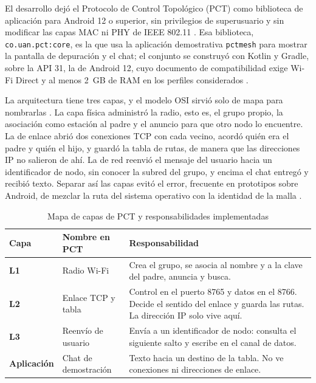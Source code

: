 \documentclass[12pt,oneside]{scrreprt}
\begin{document}
El desarrollo dejó el Protocolo de Control Topológico (PCT) como biblioteca de aplicación para Android 12 o superior, sin privilegios de superusuario y sin modificar las capas MAC ni PHY de IEEE 802.11 \parencite{IEEE2020,Google2021}. Esa biblioteca, \texttt{co.uan.pct:core}, es la que usa la aplicación demostrativa \texttt{pctmesh} para mostrar la pantalla de depuración y el chat; el conjunto se construyó con Kotlin y Gradle, sobre la API 31, la de Android 12, cuyo documento de compatibilidad exige Wi-Fi Direct y al menos 2~GB de RAM en los perfiles considerados \parencite{Google2021}.

La arquitectura tiene tres capas, y el modelo OSI sirvió solo de mapa para nombrarlas \parencite{Tanenbaum2011}. La capa física administró la radio, esto es, el grupo propio, la asociación como estación al padre y el anuncio para que otro nodo lo encuentre. La de enlace abrió dos conexiones TCP con cada vecino, acordó quién era el padre y quién el hijo, y guardó la tabla de rutas, de manera que las direcciones IP no salieron de ahí. La de red reenvió el mensaje del usuario hacia un identificador de nodo, sin conocer la subred del grupo, y encima el chat entregó y recibió texto. Separar así las capas evitó el error, frecuente en prototipos sobre Android, de mezclar la ruta del sistema operativo con la identidad de la malla \parencite{TanenbaumVanSteen2007}.

\begin{table}[H]
\centering
\singlespacing
\caption{Mapa de capas de PCT y responsabilidades implementadas}
\label{tab:met-capas}
\renewcommand{\arraystretch}{1.15}
\begin{tabularx}{\textwidth}{@{} >{\raggedright\arraybackslash\bfseries}p{2.2cm} >{\raggedright\arraybackslash}p{3.4cm} X @{}}
\toprule
Capa & Nombre en PCT & Responsabilidad \\
\midrule
L1 & Radio Wi-Fi & Crea el grupo, se asocia al nombre y a la clave del padre, anuncia y busca. \\
L2 & Enlace TCP y tabla & Control en el puerto 8765 y datos en el 8766. Decide el sentido del enlace y guarda las rutas. La dirección IP solo vive aquí. \\
L3 & Reenvío de usuario & Envía a un identificador de nodo: consulta el siguiente salto y escribe en el canal de datos. \\
Aplicación & Chat de demostración & Texto hacia un destino de la tabla. No ve conexiones ni direcciones de enlace. \\
\bottomrule
\end{tabularx}
\end{table}
\end{document}

